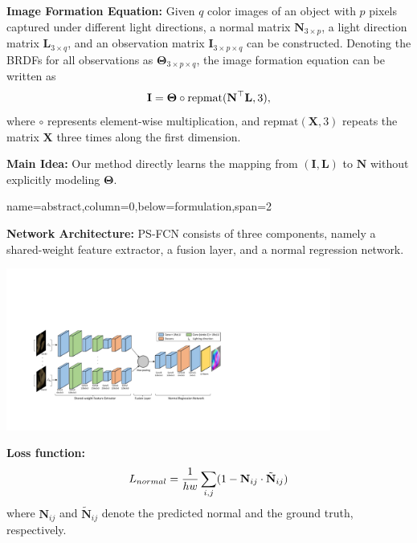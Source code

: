 \documentclass[a0paper,landscape]{baposter}
\begin{document}
\begin{poster}
{        \textbf{\color{blue}Image Formation Equation:} Given $q$ color images of an object with $p$ pixels captured under different light directions, a normal matrix $\mathbf{N}_{3\times p}$, a light direction matrix $\mathbf{L}_{3\times q}$, and an observation matrix $\mathbf{I}_{3\times p\times q}$ can be constructed. Denoting the BRDFs for all observations as $\boldsymbol{\Theta}_{3\times p\times q}$, the image formation equation can be written as
        \vspace{-0.5em}
        \begin{equation}
            \textbf{I} = \boldsymbol{\Theta} \circ \text{repmat}(\textbf{N}^\top \textbf{L}, 3),
            \vspace{-0.5em}
        \end{equation}
        where $\circ$ represents element-wise multiplication, and $\text{repmat}(\mathbf{X},3)$ repeats the matrix $\mathbf{X}$ three times along the first dimension. 
        
        \textbf{\color{blue}Main Idea:} Our method directly learns the mapping from $(\textbf{I}, \textbf{L})$ to $\textbf{N}$ without explicitly modeling $\boldsymbol\Theta$.
    }

    {name=abstract,column=0,below=formulation,span=2}
    {
        \textbf{\color{blue}Network Architecture:} PS-FCN consists of three components, namely a shared-weight feature extractor, a fusion layer, and a normal regression network.
        \vspace{-0.5em}
        \begin{center}
        \includegraphics[width=0.8\textwidth]{images/network_v2.pdf}
        \end{center}
        \vspace{-0.5em}
        \textbf{\color{blue}Loss function:}
        \vspace{-0.5em} 
        \begin{equation}
            L_{normal} = \frac{1}{hw} \sum_{i,j} (1 - \mathbf{N}_{ij} \cdot \tilde{\mathbf{N}}_{ij})
            \vspace{-0.5em} 
        \end{equation}
        where $\mathbf{N}_{ij}$ and $\tilde{\mathbf{N}}_{ij}$ denote the predicted normal and the ground truth, respectively.
    }

    \end{poster}
\end{document}
